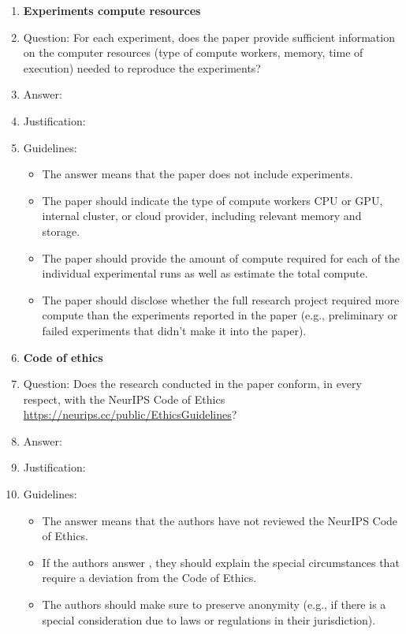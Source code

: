 \documentclass{article}
\begin{document}
\begin{enumerate}
\item {\bf Experiments compute resources}
    \item[] Question: For each experiment, does the paper provide sufficient information on the computer resources (type of compute workers, memory, time of execution) needed to reproduce the experiments?
    \item[] Answer: \answerTODO{} %
    \item[] Justification: \justificationTODO{}
    \item[] Guidelines:
    \begin{itemize}
        \item The answer \answerNA{} means that the paper does not include experiments.
        \item The paper should indicate the type of compute workers CPU or GPU, internal cluster, or cloud provider, including relevant memory and storage.
        \item The paper should provide the amount of compute required for each of the individual experimental runs as well as estimate the total compute. 
        \item The paper should disclose whether the full research project required more compute than the experiments reported in the paper (e.g., preliminary or failed experiments that didn't make it into the paper). 
    \end{itemize}
    
\item {\bf Code of ethics}
    \item[] Question: Does the research conducted in the paper conform, in every respect, with the NeurIPS Code of Ethics \url{https://neurips.cc/public/EthicsGuidelines}?
    \item[] Answer: \answerTODO{} %
    \item[] Justification: \justificationTODO{}
    \item[] Guidelines:
    \begin{itemize}
        \item The answer \answerNA{} means that the authors have not reviewed the NeurIPS Code of Ethics.
        \item If the authors answer \answerNo, they should explain the special circumstances that require a deviation from the Code of Ethics.
        \item The authors should make sure to preserve anonymity (e.g., if there is a special consideration due to laws or regulations in their jurisdiction).
    \end{itemize}



\end{enumerate}
\end{document}
